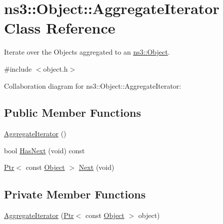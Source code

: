 \hypertarget{classns3_1_1Object_1_1AggregateIterator}{}\section{ns3\+:\+:Object\+:\+:Aggregate\+Iterator Class Reference}
\label{classns3_1_1Object_1_1AggregateIterator}


Iterate over the Objects aggregated to an \hyperlink{classns3_1_1Object}{ns3\+::\+Object}.  




{\ttfamily \#include $<$object.\+h$>$}



Collaboration diagram for ns3\+:\+:Object\+:\+:Aggregate\+Iterator\+:
\subsection*{Public Member Functions}
\begin{DoxyCompactItemize}
\item 
\hyperlink{classns3_1_1Object_1_1AggregateIterator_a647de3714c545444533240ca21c76356}{Aggregate\+Iterator} ()
\item 
bool \hyperlink{classns3_1_1Object_1_1AggregateIterator_ac1c1e997ffc59341594cba265e8c363b}{Has\+Next} (void) const 
\item 
\hyperlink{classns3_1_1Ptr}{Ptr}$<$ const \hyperlink{classns3_1_1Object}{Object} $>$ \hyperlink{classns3_1_1Object_1_1AggregateIterator_a894f339a7c84411cb99bd2d392d175eb}{Next} (void)
\end{DoxyCompactItemize}
\subsection*{Private Member Functions}
\begin{DoxyCompactItemize}
\item 
\hyperlink{classns3_1_1Object_1_1AggregateIterator_aeaa4d1b5ed4767c9b178898be1903337}{Aggregate\+Iterator} (\hyperlink{classns3_1_1Ptr}{Ptr}$<$ const \hyperlink{classns3_1_1Object}{Object} $>$ object)
\end{DoxyCompactItemize}
